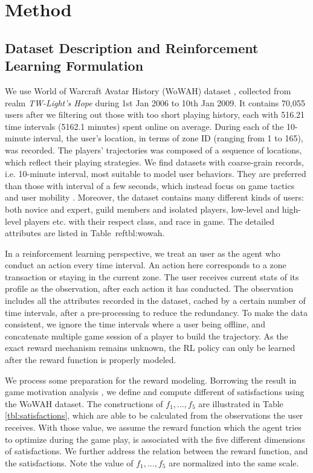 \documentclass{sigchi}
\begin{document}
\section{Method}

\subsection{Dataset Description and Reinforcement Learning Formulation}

We use World of Warcraft Avatar History (WoWAH) dataset \cite{lee2011world}, collected from realm \textit{TW-Light's Hope} during 1st Jan 2006 to 10th Jan 2009.
It contains 70,055 users after we filtering out those with too short playing history, each with 516.21 time intervals (5162.1 minutes) spent online on average.
During each of the 10-minute interval, the user's location, in terms of zone ID (ranging from 1 to 165), was recorded.
The players' trajectories was composed of a sequence of locations, which reflect their playing strategies.
We find datasets with coarse-grain records, i.e. 10-minute interval, most suitable to model user behaviors.
They are preferred than those with interval of a few seconds, which instead focus on game tactics and user mobility \cite{Bell2013a,shen2014characterization}.
Moreover, the dataset contains many different kinds of users: both novice and expert, guild members and isolated players, low-level and high-level players etc. with their respect class, and race in game.
The detailed attributes are listed in Table~ref{tbl:wowah}.

In a reinforcement learning perspective, we treat an user as the agent who conduct an action every time interval.
An action here corresponds to a zone transaction or staying in the current zone.
The user receives current stats of its profile as the observation, after each action it has conducted.
The observation includes all the attributes recorded in the dataset, cached by a certain number of time intervals, after a pre-processing to reduce the redundancy.
To make the data consistent, we ignore the time intervals where a user being offline, and concatenate multiple game session of a player to build the trajectory.
As the exact reward mechanism remains unknown, the RL policy can only be learned after the reward function is properly modeled.

We process some preparation for the reward modeling.
Borrowing the result in game motivation analysis \cite{yee2006motivations}, we define and compute different of satisfactions using the WoWAH dataset.
The constructions of $f_1,\dots, f_5$ are illustrated in Table \ref{tbl:satisfactions}, which are able to be calculated from the observations the user receives.
With those value, we assume the reward function which the agent tries to optimize during the game play, is associated with the five different dimensions of satisfactions.
We further address the relation between the reward function, and the satisfactions.
Note the value of $f_1,\dots, f_5$ are normalized into the same scale.
\end{document}
